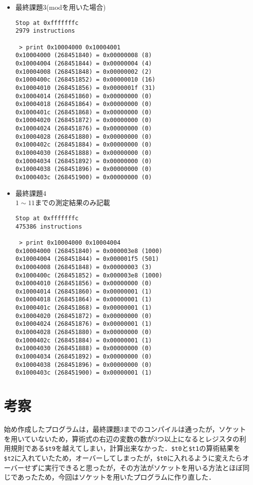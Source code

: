 \documentclass{jarticle}[11pt]
\begin{document}
\begin{itemize}
\item 最終課題$3$(modを用いた場合)
\begin{verbatim}
Stop at 0xfffffffc
2979 instructions

 > print 0x10004000 0x10004001
0x10004000 (268451840) = 0x00000008 (8)
0x10004004 (268451844) = 0x00000004 (4)
0x10004008 (268451848) = 0x00000002 (2)
0x1000400c (268451852) = 0x00000010 (16)
0x10004010 (268451856) = 0x0000001f (31)
0x10004014 (268451860) = 0x00000000 (0)
0x10004018 (268451864) = 0x00000000 (0)
0x1000401c (268451868) = 0x00000000 (0)
0x10004020 (268451872) = 0x00000000 (0)
0x10004024 (268451876) = 0x00000000 (0)
0x10004028 (268451880) = 0x00000000 (0)
0x1000402c (268451884) = 0x00000000 (0)
0x10004030 (268451888) = 0x00000000 (0)
0x10004034 (268451892) = 0x00000000 (0)
0x10004038 (268451896) = 0x00000000 (0)
0x1000403c (268451900) = 0x00000000 (0)
\end{verbatim}

\item 最終課題$4$ \\
$1\sim11$までの測定結果のみ記載
\begin{verbatim}
Stop at 0xfffffffc
475386 instructions

 > print 0x10004000 0x10004004
0x10004000 (268451840) = 0x000003e8 (1000)
0x10004004 (268451844) = 0x000001f5 (501)
0x10004008 (268451848) = 0x00000003 (3)
0x1000400c (268451852) = 0x000003e8 (1000)
0x10004010 (268451856) = 0x00000000 (0)
0x10004014 (268451860) = 0x00000001 (1)
0x10004018 (268451864) = 0x00000001 (1)
0x1000401c (268451868) = 0x00000001 (1)
0x10004020 (268451872) = 0x00000000 (0)
0x10004024 (268451876) = 0x00000001 (1)
0x10004028 (268451880) = 0x00000000 (0)
0x1000402c (268451884) = 0x00000001 (1)
0x10004030 (268451888) = 0x00000000 (0)
0x10004034 (268451892) = 0x00000000 (0)
0x10004038 (268451896) = 0x00000000 (0)
0x1000403c (268451900) = 0x00000001 (1)
\end{verbatim}
\end{itemize}
\section{考察}
始め作成したプログラムは，最終課題$3$までのコンパイルは通ったが，ソケットを用いていないため，算術式の右辺の変数の数が$3$つ以上になるとレジスタの利用規則である\verb|$t9|を越えてしまい，計算出来なかった．\verb|$t0|と\verb|$t1|の算術結果を\verb|$t2|に入れていたため，オーバーしてしまったが，\verb|$t0|に入れるように変えたらオーバーせずに実行できると思ったが，その方法がソケットを用いる方法とほぼ同じであったため，今回はソケットを用いたプログラムに作り直した．
\end{document}

